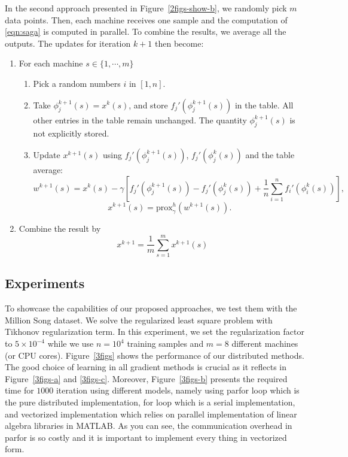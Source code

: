 \documentclass[a4paper,11pt]{article}
\newcommand{\prox}{\textrm{prox}}
\begin{document}
In the second approach presented in Figure~\ref{2figs-show-b}, we randomly pick $m$ data points. Then, each machine receives one sample and the computation of \eqref{eqn:saga} is computed in parallel. To combine the results, we average all the outputs. The updates for iteration $k+1$ then become:
\begin{enumerate}	
	\item For each machine $s \in \{ 1, \cdots, m \}$
	\begin{enumerate}
		\item Pick a random numbers $i$ in $[1, n]$.
		\item Take $\phi_j^{k+1}(s) = x^k(s)$, and store $f_j'(\phi_j^{k+1}(s))$ in the table.
		All other entries in the table remain unchanged. The quantity $\phi_j^{k+1}(s)$
		is not explicitly stored.
		\item Update $x^{k+1}(s)$ using $f_j'(\phi_j^{k+1}(s))$, $f_j'(\phi_j^k(s))$ and the table
		average:
		\begin{equation}
		w^{k+1}(s) = x^k(s) - \gamma \left[ f_j'(\phi_j^{k+1}(s)) - f_j'(\phi_j^k(s))
		+ \frac1n \sum_{i=1}^n f_i'(\phi_i^k(s)) \right] ,
		\end{equation}
		$$x^{k+1}(s) = \prox_\gamma^h (w^{k+1}(s)).$$
	\end{enumerate}
	\item Combine the result by
	$$ x^{k+1} = \frac{1}{m} \sum_{s=1}^m x^{k+1}(s) $$
\end{enumerate}

\subsection{Experiments}

To showcase the capabilities of our proposed approaches, we test them with the Million Song dataset. We solve the regularized least square problem with Tikhonov regularization term. In this experiment, we set the regularization factor to $5\times 10^{-4}$ while we use $n=10^4$ training samples and $m=8$ different machines (or CPU cores). Figure~\ref{3figs} shows the performance of our distributed methods. The good choice of learning in all gradient methods is crucial as it reflects in Figure~\ref{3figs-a} and \ref{3figs-c}. Moreover, Figure~\ref{3figs-b} presents the required time for $1000$ iteration using different models, namely using parfor loop which is the pure distributed implementation, for loop which is a serial implementation, and vectorized implementation which relies on parallel implementation of linear algebra libraries in MATLAB. As you can see, the communication overhead in parfor is so costly and it is important to implement every thing in vectorized form.
\end{document}
